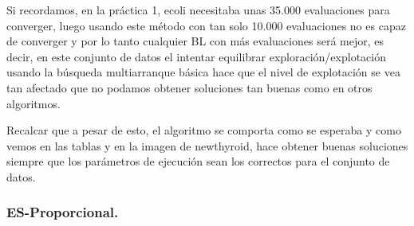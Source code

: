 \documentclass[12pt, spanish]{article}
\begin{document}
Si recordamos, en la práctica 1, ecoli necesitaba unas 35.000 evaluaciones para converger, luego usando este método con tan solo 10.000 evaluaciones no es capaz de converger y por lo tanto cualquier BL con más evaluaciones será mejor, es decir, en este conjunto de datos el intentar equilibrar exploración/explotación usando la búsqueda multiarranque básica hace que el nivel de explotación se vea tan afectado que no podamos obtener soluciones tan buenas como en otros algoritmos.

Recalcar que a pesar de esto, el algoritmo se comporta como se esperaba y como vemos en las tablas y en la imagen de newthyroid, hace obtener buenas soluciones siempre que los parámetros de ejecución sean los correctos para el conjunto de datos.

\subsubsection{ES-Proporcional.}
\end{document}
